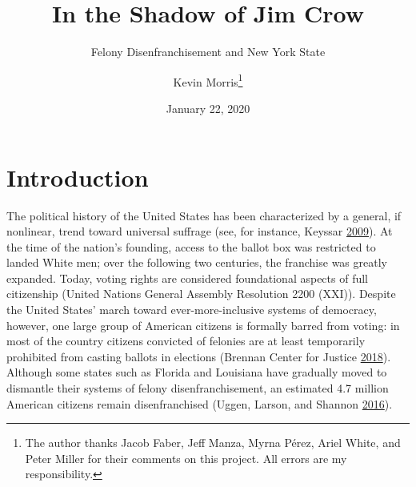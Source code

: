 \documentclass[
  12pt,
]{article}
\title{In the Shadow of Jim Crow}
\subtitle{Felony Disenfranchisement and New York State}
\author{Kevin Morris\footnote{The author thanks Jacob Faber, Jeff Manza, Myrna Pérez, Ariel White, and Peter Miller for their comments on this project. All errors are my responsibility.}}
\date{January 22, 2020}
\begin{document}
\maketitle


\tableofcontents
\pagebreak


\hypertarget{introduction}{%
\section{Introduction}\label{introduction}}

The political history of the United States has been characterized by a general, if nonlinear, trend toward universal suffrage (see, for instance, Keyssar \protect\hyperlink{ref-Keyssar2009}{2009}). At the time of the nation's founding, access to the ballot box was restricted to landed White men; over the following two centuries, the franchise was greatly expanded. Today, voting rights are considered foundational aspects of full citizenship (United Nations General Assembly Resolution 2200 (XXI)). Despite the United States' march toward ever-more-inclusive systems of democracy, however, one large group of American citizens is formally barred from voting: in most of the country citizens convicted of felonies are at least temporarily prohibited from casting ballots in elections (Brennan Center for Justice \protect\hyperlink{ref-bcj_laws}{2018}). Although some states such as Florida and Louisiana have gradually moved to dismantle their systems of felony disenfranchisement, an estimated 4.7 million American citizens remain disenfranchised (Uggen, Larson, and Shannon \protect\hyperlink{ref-sentencing_2016}{2016}).
\end{document}
